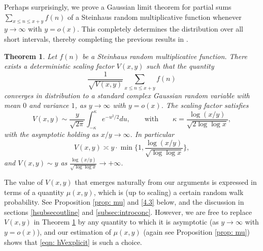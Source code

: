 \documentclass[12pt, notitlepage]{amsart}
\numberwithin{equation}{section}
\newtheorem{theorem}{Theorem}[section]
\theoremstyle{remark}
\theoremstyle{definition}
\theoremstyle{remark}
\numberwithin{equation}{section}
\begin{document}
 Perhaps surprisingly, 
we prove a Gaussian limit theorem for partial sums
$\sum_{x\le n \le x+y}f(n)$ of a Steinhaus random multiplicative function whenever $y \rightarrow \infty$ with $y=o(x)$. This completely determines the distribution over all short intervals, thereby completing the previous results in \cite{CS, SoundXu, caichshort}. 


\begin{theorem}\label{thm: main}
Let $f(n)$ be a Steinhaus random multiplicative function. There exists a deterministic scaling factor $V(x,y)$ such that the quantity 
\[ \frac{1}{\sqrt{V(x, y)}} \sum_{x\le n \le x+y}f(n)  \]
converges in distribution to a standard complex Gaussian random variable with mean $0$ and variance $1$, as $y\to \infty$ with $y=o(x)$.  The scaling factor satisfies 
\begin{equation}\label{eqn: hVexplicit}
V(x,y) \sim \frac{y}{\sqrt{2\pi}} \int_{-\kappa}^{\kappa} e^{-u^{2}/2} du, \qquad \text{with} \qquad \kappa= \frac{\log (x/y)}{\sqrt{2\log \log x}}, 
\end{equation}
with the asymptotic holding as $x/y \to \infty$.   In particular 
\begin{equation}\label{eqn: V}
  V(x, y) \asymp  y \cdot \min \Big\{1, \frac{\log (x/y)}{\sqrt{\log \log x}}\Big\},  
\end{equation}
and $V(x, y) \sim y$ as $\frac{\log(x/y)}{\sqrt{\log \log x}} \to +\infty$.
\end{theorem}


The value of $V(x,y)$ that emerges naturally from our arguments is expressed in terms of a quantity $\mu(x,y)$, which is (up to scaling) a certain random walk probability. See Proposition \ref{prop: mu} and \eqref{4.3} below, and the discussion in sections \ref{hsubsecoutline} and \ref{subsec:introconc}. However, we are free to replace $V(x,y)$ in Theorem \ref{thm: main} by any quantity to which it is asymptotic (as $y\to \infty$ with $y=o(x)$), and our estimation of $\mu(x,y)$ (again see Proposition \ref{prop: mu}) shows that \eqref{eqn: hVexplicit} is such a choice.
\end{document}
